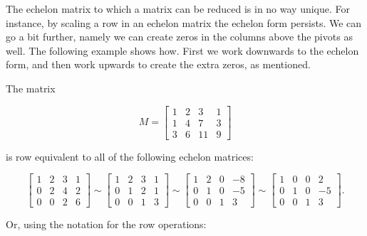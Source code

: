 The echelon matrix to which a matrix can be reduced is in no way unique.  For instance, by scaling a row in an echelon matrix the echelon form persists. We can go a bit further, namely we can create zeros in the columns above the pivots as well. The following example shows how. First we work downwards to the echelon form, and then work upwards to create the extra zeros, as mentioned.

\begin{ex}
\label{Ex:LinSystems:RowReduction-2}
The matrix

$$

   M = 
\begin{bmatrix} 1 & 2 & 3 & 1\\ 1 & 4 & 7 & 3\\ 3 & 6 & 11 & 9
       \end{bmatrix}
$$

is row equivalent to all of the following echelon matrices:

$$

  
\begin{bmatrix} 1 & 2 & 3 & 1\\ 0 & 2 & 4 & 2\\ 0 & 0 & 2 & 6 \end{bmatrix} \sim
  
\begin{bmatrix} 1 & 2 & 3 & 1\\ 0 & 1 & 2 & 1\\ 0 & 0 & 1 & 3 \end{bmatrix} \sim
  
\begin{bmatrix} 1 & 2 & 0 & -8\\ 0 & 1 & 0 & -5\\ 0 & 0 & 1 & 3 \end{bmatrix} \sim
  
\begin{bmatrix} 1 & 0 & 0 & 2\\ 0 & 1 & 0 & -5\\ 0 & 0 & 1 & 3 \end{bmatrix}.
$$



Or, using the notation for the row operations:

$$


\end{ex}
